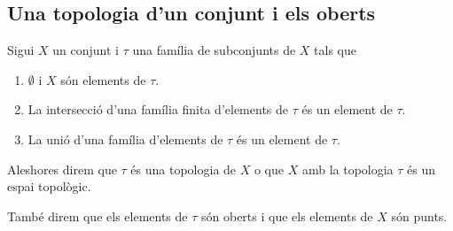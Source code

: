 \documentclass[../Apunts.tex]{subfiles}
\begin{document}
	\subsection{Una topologia d'un conjunt i els oberts}
	\begin{definition}[Topologia]	%
		\label{def:topologia}
		\label{def:espai topològic}
		\label{def:obert}
		\label{def:punt}
		Sigui \(X\) un conjunt i \(\tau\) una família de subconjunts de \(X\) tals que
		\begin{enumerate}
		\item \(\emptyset\) i \(X\) són elements de \(\tau\).
		\item La intersecció d'una família finita d'elements de \(\tau\) és un element de \(\tau\).
		\item La unió d'una família d'elements de \(\tau\) és un element de \(\tau\).
		\end{enumerate}
		Aleshores direm que \(\tau\) és una topologia de \(X\) o que \(X\) amb la topologia \(\tau\) és un espai topològic.
		
		També direm que els elements de \(\tau\) són oberts i que els elements de \(X\) són punts.
	\end{definition}
\end{document}
